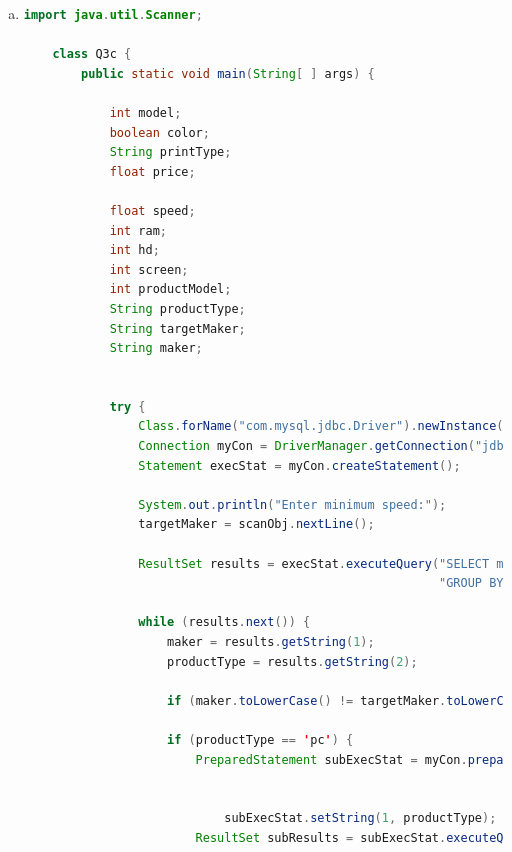 \documentclass[12pt]{article}
\begin{document}
\begin{enumerate}[1.]
\begin{enumerate}[a)]
\begin{lstlisting}[language=JAVA]
                    if (
                        speed >= minSpeed &&
                        ram >= minRam &&
                        hd >= minHd &&
                        screen >= minScreen
                    ) {
                        System.out.println(String.format("model=%d, speed=%.2f, ram=%d, hd=%d, screen=%d, price=%.2f, maker=%c",
                            model, speed, ram, hd, screen, price, maker));
                    }
                }

            } catch (SQLException ex) {
                // handle the error
                System.out.println("Error occured while establishing database connection");
            }
        }
    }
    \end{lstlisting}

        \item

    \begin{lstlisting}[language=JAVA]
    import java.util.Scanner;

    class Q3c {
        public static void main(String[ ] args) {

            int model;
            boolean color;
            String printType;
            float price;

            float speed;
            int ram;
            int hd;
            int screen;
            int productModel;
            String productType;
            String targetMaker;
            String maker;


            try {
                Class.forName("com.mysql.jdbc.Driver").newInstance();
                Connection myCon = DriverManager.getConnection("jdbc:mysql://localhost/Q3");
                Statement execStat = myCon.createStatement();

                System.out.println("Enter minimum speed:");
                targetMaker = scanObj.nextLine();

                ResultSet results = execStat.executeQuery("SELECT maker, productType FROM Product" +
                                                          "GROUP BY maker, productType");

                while (results.next()) {
                    maker = results.getString(1);
                    productType = results.getString(2);

                    if (maker.toLowerCase() != targetMaker.toLowerCase()) continue;

                    if (productType == 'pc') {
                        PreparedStatement subExecStat = myCon.prepareStatement("SELECT speed, ram, hd, price FROM PC " +
                                                                                "NATURAL JOIN Product " +
                                                                                "WHERE type= ?");
                            subExecStat.setString(1, productType);
                        ResultSet subResults = subExecStat.executeQuery();


\end{lstlisting}
\end{enumerate}
\end{enumerate}
\end{document}
